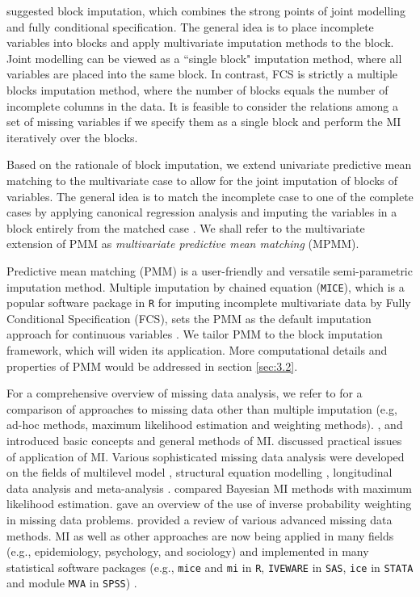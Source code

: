 	\citet[section 4.7.2]{Buuren2018} suggested block imputation, which combines the strong points of joint modelling and fully conditional specification. The general idea is to place incomplete variables into blocks and apply multivariate imputation methods to the block. Joint modelling can be viewed as a ``single block" imputation method, where all variables are placed into the same block. In contrast, FCS is strictly a multiple blocks imputation method, where the number of blocks equals the number of incomplete columns in the data. It is feasible to consider the relations among a set of missing variables if we specify them as a single block and perform the MI iteratively over the blocks. 
	
	Based on the rationale of block imputation, we extend univariate predictive mean matching to the multivariate case to allow for the joint imputation of blocks of variables. The general idea is to match the incomplete case to one of the complete cases by applying canonical regression analysis and imputing the variables in a block entirely from the matched case \citep{little1988missing}. We shall refer to the multivariate extension of PMM as \emph{multivariate predictive mean matching} (MPMM).  
	
	Predictive mean matching (PMM) is a user-friendly and versatile semi-parametric imputation method. Multiple imputation by chained equation (\texttt{MICE}), which is a popular software package in \texttt{R} for imputing incomplete multivariate data by Fully Conditional Specification (FCS), sets the PMM as the default imputation approach for continuous variables \citep{Buuren2011}. We tailor PMM to the block imputation framework, which will widen its application. More computational details and properties of PMM would be addressed in section \ref{sec:3.2}.       
	
	
	For a comprehensive overview of missing data analysis, we refer to \citet{little2019statistical} for a comparison of approaches to missing data other than multiple imputation (e.g, ad-hoc methods, maximum likelihood estimation and weighting methods). \citet{schafer1999multiple}, \citet{sinharay2001use} and \citet{allison2001missing} introduced basic concepts and general methods of MI. \citet{schafer2002missing} discussed practical issues of application of MI. Various sophisticated missing data analysis were developed on the fields of multilevel model \citep{longford2001multilevel}, structural equation modelling \citep{olinsky2003comparative, allison2003missing}, longitudinal data analysis \citep{twisk2002attrition, demirtas2004modeling} and meta-analysis \citep{pigott2001missing}. \citet{schafer2003multiple} compared Bayesian MI methods with maximum likelihood estimation. \citet{seaman2013review} gave an overview of the use of inverse probability weighting in missing data problems. \citet{ibrahim2005missing} provided a review of various advanced missing data methods. MI as well as other approaches are now being applied in many fields (e.g., epidemiology, psychology, and sociology) and implemented in many statistical software packages (e.g., \texttt{mice} and \texttt{mi} in \texttt{R}, \texttt{IVEWARE} in \texttt{SAS}, \texttt{ice} in \texttt{STATA} and module \texttt{MVA} in \texttt{SPSS}) \citep{Buuren2011}.
	
